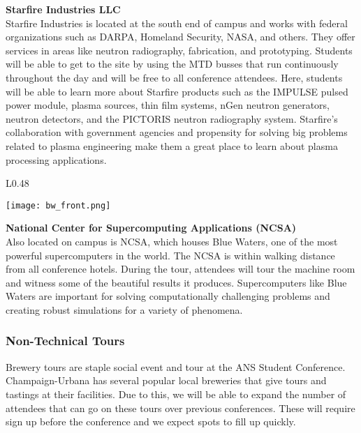 \textbf{Starfire Industries LLC}\\
Starfire Industries is located at the south end of campus and works with federal organizations such as DARPA, Homeland Security, NASA, and others. They offer services in areas like neutron radiography, fabrication, and prototyping. Students will be able to get to the site by using the MTD busses that run continuously throughout the day and will be free to all conference attendees. Here, students will be able to learn more about Starfire products such as the IMPULSE pulsed power module, plasma sources, thin film systems, nGen neutron generators, neutron detectors, and the PICTORIS neutron radiography system. Starfire’s collaboration with government agencies and propensity for solving big problems related to plasma engineering make them a great place to learn about plasma processing applications.\\

\setlength\intextsep{0pt}
\begin{wrapfigure}{L}{0.48\textwidth}
	\begin{center}
		\texttt{[image: bw\_front.png]}
	\end{center}
\end{wrapfigure}
\textbf{National Center for Supercomputing Applications (NCSA)}\\
Also located on campus is NCSA, which houses Blue Waters, one of the most powerful supercomputers in the world. The NCSA is within walking distance from all conference hotels. During the tour, attendees will tour the machine room and witness some of the beautiful results it produces. Supercomputers like Blue Waters are important for solving computationally challenging problems and creating robust simulations for a variety of phenomena.\\

\subsubsection{Non-Technical Tours}



Brewery tours are staple social event and tour at the ANS Student Conference. Champaign-Urbana has several popular local breweries that give tours and tastings at their facilities. Due to this, we will be able to expand the number of attendees that can go on these tours over previous conferences. These will require sign up before the conference and we expect spots to fill up quickly.\\


